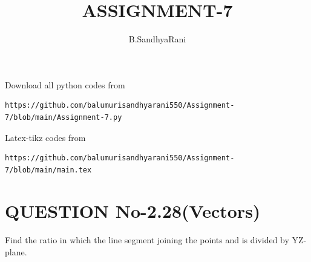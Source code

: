 \documentclass[journal,12pt,twocolumn]{IEEEtran}
\begin{document}
     \def\rightbox#1{\makebox[0in][r]{#1}}
     \def\centbox#1{\makebox[0in]{#1}}
     \def\topbox#1{\raisebox{-\baselineskip}[0in][0in]{#1}}
     \def\midbox#1{\raisebox{-0.5\baselineskip}[0in][0in]{#1}}
\vspace{3cm}
\title{ASSIGNMENT-7}
\author{B.SandhyaRani}
\maketitle
\newpage
\bigskip
\renewcommand{\thefigure}{\theenumi}
\renewcommand{\thetable}{\theenumi}
%
Download all python codes from 
\begin{lstlisting}
https://github.com/balumurisandhyarani550/Assignment-7/blob/main/Assignment-7.py
\end{lstlisting}
%
Latex-tikz codes from 
%
\begin{lstlisting}
https://github.com/balumurisandhyarani550/Assignment-7/blob/main/main.tex
\end{lstlisting}
%
\section{QUESTION No-2.28(Vectors)}
Find the ratio in  which the line segment joining the points  and  is divided by YZ-plane. 
\end{document}
